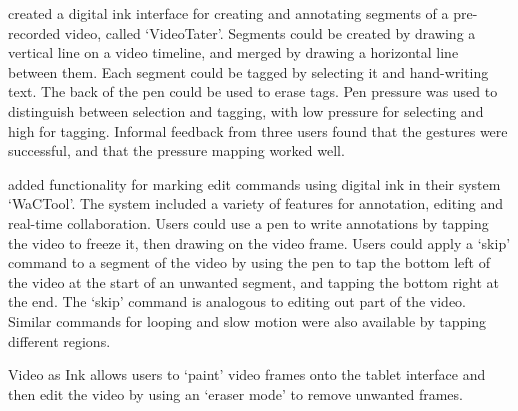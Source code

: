 \citet{Diakopoulos2006} created a digital ink interface for creating and annotating segments of a pre-recorded video,
called `VideoTater'. Segments could be created by drawing a vertical line on a video timeline, and merged by drawing a
horizontal line between them. Each segment could be tagged by selecting it and hand-writing text. The back of
the pen could be used to erase tags. Pen pressure was used to distinguish between selection and tagging, with low
pressure for selecting and high for tagging. Informal feedback from three users found that the gestures were
successful, and that the pressure mapping worked well.

\citet{Cattelan2008} added functionality for marking edit commands using digital ink in their system `WaCTool'. The
system included a variety of features for annotation, editing and real-time collaboration. Users could use a pen to
write annotations by tapping the video to freeze it, then drawing on the video frame.  Users could apply a `skip'
command to a segment of the video by using the pen to tap the bottom left of the video at the start of an unwanted
segment, and tapping the bottom right at the end. The `skip' command is analogous to editing out part of the video.
Similar commands for looping and slow motion were also available by tapping different regions.


Video as Ink \citep{Cabral2016} allows users to `paint' video frames onto the tablet interface and
then edit the video by using an `eraser mode' to remove unwanted frames.

